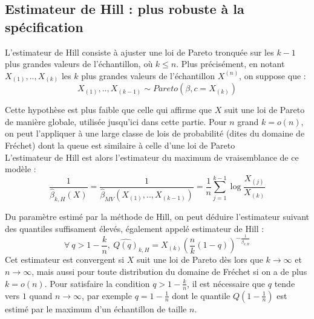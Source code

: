 \documentclass{article}
\renewcommand*{\(}{ \left( }
\renewcommand*{\)}{ \right) }
\begin{document}
\subsection{Estimateur de Hill : plus robuste à la spécification}

L'estimateur de Hill consiste à ajuster une loi de Pareto tronquée sur les $k-1$ plus grandes valeurs de l'échantillon, où $k \leq n$. Plus précisément, en notant $X_{(1)},..,X_{(k)}$ les $k$ plus grandes valeurs de l'échantillon $X^{(n)}$, on suppose que :
\[ X_{(1)},..,X_{(k-1)} \sim Pareto(\beta,c=X_{(k)}) \]

Cette hypothèse est plus faible que celle qui affirme que $X$ suit une loi de Pareto de manière globale, utilisée jusqu'ici dans cette partie. Pour $n$ grand $k = o(n)$, on peut l'appliquer à une large classe de lois de probabilité (dites du domaine de Fréchet) dont la queue est similaire à celle d'une loi de Pareto \cite{Planchet}\\ 

L'estimateur de Hill est alors l'estimateur du maximum de vraisemblance de ce modèle :
\[ \frac{1}{\widehat{\beta}_{k,H}(X)} = \frac{1}{\widehat{\beta}_{MV}(X_{(1)},..,X_{(k-1)})} = \frac{1}{n} \sum_{j=1}^{k-1}\log \frac{X_{(j)}}{X_{(k)}} \]

Du paramètre estimé par la méthode de Hill, on peut déduire l'estimateur suivant des quantiles suffisament élevés, également appelé estimateur de Hill \cite{Planchet}:
\[ \forall\ q > 1-\frac{k}{n},\ \widehat{Q(q)}_{k,H} = X_{(k)} \left( \frac{n}{k}(1-q) \right)^{-\frac{1}{\widehat{\beta}_{k,H}}} \]
Cet estimateur est convergent si $X$ suit une loi de Pareto dès lors que $k\rightarrow \infty$ et $n\rightarrow \infty$, mais aussi pour toute distribution du domaine de Fréchet si on a de plus $k = o(n)$. Pour satisfaire la condition $q > 1-\frac{k}{n}$, il est nécessaire que $q$ tende vers $1$ quand $n\rightarrow \infty$, par exemple $q = 1-\frac{1}{n}$ dont le quantile $Q(1-\frac{1}{n})$ est estimé par le maximum d'un échantillon de taille $n$. 

\end{document}
